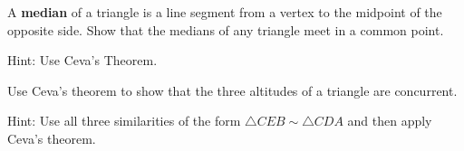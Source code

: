 \begin{question}
A \textbf{median} of a triangle is a line segment from a vertex
to the midpoint of the opposite side. Show that the medians of any triangle
meet in a common point.

Hint: Use Ceva's Theorem.
\end{question}

\begin{question}
Use Ceva's theorem to show that the three altitudes of a
triangle are concurrent.
\begin{image}
\end{image}
Hint: Use all three similarities of the form $\triangle
CEB\sim\triangle CDA$ and then apply Ceva's theorem.
\end{question}



